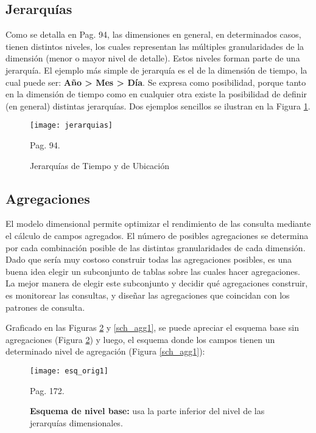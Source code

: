 \documentclass[a4paper,11pt]{article}
\begin{document}
\begin{flushleft}
    
    \subsection{Jerarquías}
    
    Como se detalla en \cite{olap_solutions} Pag. 94, las dimensiones en general, en determinados casos, tienen distintos niveles, los cuales representan las
    múltiples granularidades de la dimensión (menor o mayor nivel de detalle). Estos niveles forman parte de una jerarquía. El ejemplo más simple de
    jerarquía es el de la dimensión de tiempo, la cual puede ser: \textbf{Año > Mes > Día}. Se expresa como posibilidad, porque tanto en la dimensión de
    tiempo como en cualquier otra existe la posibilidad de definir (en general) distintas jerarquías. Dos ejemplos sencillos se ilustran en la Figura
    \ref{jerarquias}.
    
    \begin{figure}
      \begin{center}
        \texttt{[image: jerarquias]}
        \caption{Jerarquías de Tiempo y de Ubicación} \cite{olap_solutions} Pag. 94.
        \label{jerarquias}
      \end{center}
    \end{figure}
    
    
    \subsection{Agregaciones}
    
    El modelo dimensional permite optimizar el rendimiento de las consulta mediante el cálculo de campos agregados. El número de posibles agregaciones se
    determina por cada combinación posible de las distintas granularidades de cada dimensión. Dado que sería muy costoso construir todas las agregaciones 
    posibles, es una buena idea elegir un subconjunto de tablas sobre las cuales hacer agregaciones. La mejor manera de elegir este subconjunto y decidir qué 
    agregaciones construir, es monitorear las consultas, y diseñar las agregaciones que coincidan con los patrones de consulta.\par
    
    Graficado en las Figuras \ref{sch_orig1} y \ref{sch_agg1}, se puede apreciar el esquema base sin agregaciones (Figura \ref{sch_orig1}) y luego, el esquema
    donde los campos tienen un determinado nivel de agregación (Figura \ref{sch_agg1}):
    
    \begin{figure}
      \begin{center}
        \texttt{[image: esq\_orig1]}
        \caption{\textbf{Esquema de nivel base:} usa la parte inferior del nivel de las jerarquías dimensionales.} \cite{nagabhushana} Pag. 172.
        \label{sch_orig1}
      \end{center}
    \end{figure}
    

\end{flushleft}
\end{document}

